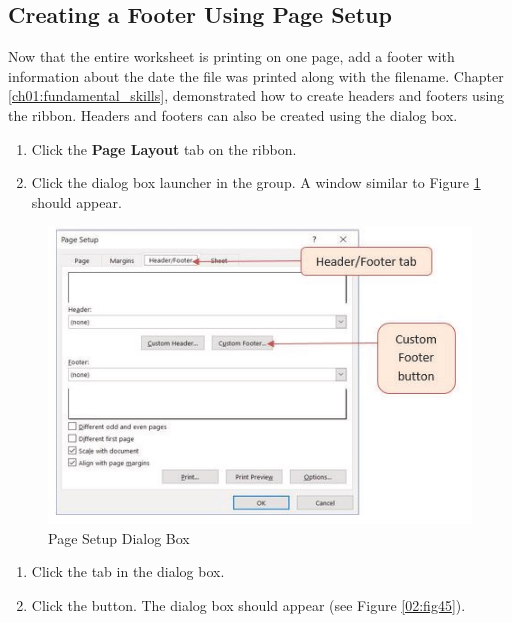 \subsection{Creating a Footer Using Page Setup}

Now that the entire worksheet is printing on one page, add a footer with information about the date the file was printed along with the filename. Chapter \ref{ch01:fundamental_skills},  demonstrated how to create headers and footers using the  ribbon. Headers and footers can also be created using the  dialog box.

\begin{enumerate}
	\item Click the \textbf{Page Layout} tab on the ribbon.
	\item Click the dialog box launcher in the  group. A window similar to Figure \ref{02:fig44} should appear.
\end{enumerate}

\begin{figure}[H]
	\centering
	\includegraphics[width=\maxwidth{.95\linewidth}]{gfx/ch02_fig44}
	\caption{Page Setup Dialog Box}
	\label{02:fig44}
\end{figure}

\begin{enumerate}[resume]
	\item Click the  tab in the  dialog box.
	\item Click the  button. The  dialog box should appear (see Figure \ref{02:fig45}).
\end{enumerate}

